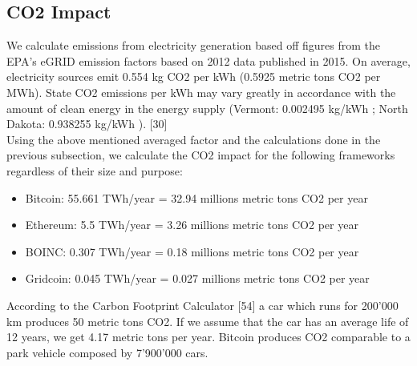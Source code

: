 \subsection{CO2 Impact}

We calculate emissions from electricity generation based off figures from the EPA’s eGRID emission factors based on 2012 data published in 2015.  On average, electricity sources emit 0.554 kg CO2 per kWh (0.5925 metric tons CO2 per MWh). State CO2 emissions per kWh may vary greatly in accordance with the amount of clean energy in the energy supply (Vermont: 0.002495 kg/kWh ; North Dakota: 0.938255 kg/kWh ). [30]\\

Using the above mentioned averaged factor and the calculations done in the previous subsection, we calculate the CO2 impact for the following frameworks regardless of their size and purpose:

\begin{itemize}
  \item Bitcoin: 55.661 TWh/year = 32.94 millions metric tons CO2 per year
  \item Ethereum: 5.5 TWh/year = 3.26 millions metric tons CO2 per year
  \item BOINC: 0.307 TWh/year = 0.18 millions metric tons CO2 per year
  \item Gridcoin: 0.045 TWh/year =  0.027 millions metric tons CO2 per year
\end{itemize}

According to the Carbon Footprint Calculator [54] a car which runs for 200'000 km produces 50 metric tons CO2. If we assume that the car has an average life of 12 years, we get 4.17 metric tons per year. Bitcoin produces CO2 comparable to a park vehicle composed by 7'900'000 cars. 


 